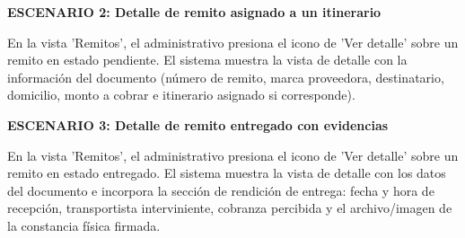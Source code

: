 \documentclass[a4paper,9pt]{article}
\begin{document}
\begin{tcolorbox}[hucard, title={\textbf{HU-39: CONSULTAR DETALLE DE UN REMITO} \hfill \scriptsize \colorbox{tealstatus}{\textbf{\ Accepted\ }} \quad \colorbox{white}{\textcolor{primarydark}{\textbf{\ 2 pts\ }}}}]
{\noindent\textbf{\textcolor{secondarydark}{ESCENARIO 2:  Detalle de remito asignado a un itinerario}}\par\vspace{1pt}
En la vista 'Remitos', el administrativo presiona el icono de 'Ver detalle' sobre un remito en estado pendiente. El sistema muestra la vista de detalle con la información del documento (número de remito, marca proveedora, destinatario, domicilio, monto a cobrar e itinerario asignado si corresponde).\par\vspace{2.5pt}
\noindent\textbf{\textcolor{secondarydark}{ESCENARIO 3:  Detalle de remito entregado con evidencias}}\par\vspace{1pt}
En la vista 'Remitos', el administrativo presiona el icono de 'Ver detalle' sobre un remito en estado entregado. El sistema muestra la vista de detalle con los datos del documento e incorpora la sección de rendición de entrega: fecha y hora de recepción, transportista interviniente, cobranza percibida y el archivo/imagen de la constancia física firmada.\par\vspace{2.5pt}
}\par
\end{tcolorbox}
\end{document}
